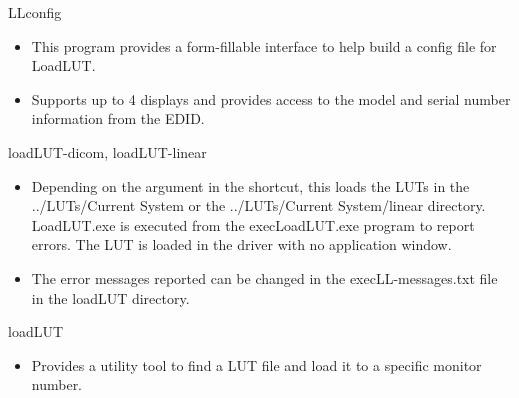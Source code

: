 LLconfig
\begin{itemize}
\item This program provides a form-fillable interface to help build a config file for LoadLUT. 
\item Supports up to 4 displays and provides access to the model and serial number information from the EDID.
\end{itemize} 

loadLUT-dicom, loadLUT-linear
\begin{itemize}
\item Depending on the argument in the shortcut, this loads the LUTs in the \textnormal{../LUTs/Current System} or the \textnormal{../LUTs/Current System/linear} directory. \textnormal{LoadLUT.exe} is executed from the \textnormal{execLoadLUT.exe} program to report errors. The LUT is loaded in the driver with no application window. 
\item The error messages reported can be changed in the execLL-messages.txt file in the loadLUT directory. 
\end{itemize}

loadLUT
\begin{itemize}
\item Provides a utility tool to find a LUT file and load it to a specific monitor number.
\end{itemize}

%